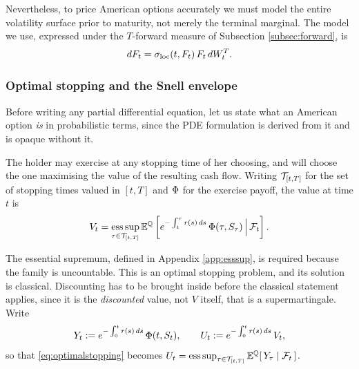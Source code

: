 Nevertheless, to price American options accurately we must model the entire volatility surface prior 
to maturity, not merely the terminal marginal. The model we use, expressed under the $T$-forward 
measure of Subsection \ref{subsec:forward}, is
\begin{equation}\label{eq:localvolforward}
    dF_t = \sigma_{\mathrm{loc}}(t,F_t)\,F_t \, dW^{T}_t .
\end{equation}


\subsubsection*{Optimal stopping and the Snell envelope}

Before writing any partial differential equation, let us state what an American option \emph{is} in 
probabilistic terms, since the PDE formulation is derived from it and is opaque without it.

The holder may exercise at any stopping time of her choosing, and will choose the one maximising the 
value of the resulting cash flow. Writing $\mathcal{T}_{[t,T]}$ for the set of stopping times valued in 
$[t,T]$ and $\Phi$ for the exercise payoff, the value at time $t$ is
\begin{equation}\label{eq:optimalstopping}
V_t = \operatorname*{ess\,sup}_{\tau \in \mathcal{T}_{[t,T]}} 
\mathbb{E}^{\mathbb{Q}}\left[ e^{-\int_t^{\tau}r(s)\,ds}\,\Phi(\tau, S_\tau) \,\Big|\, \mathcal{F}_t \right].
\end{equation}

\newpage

The essential supremum, defined in Appendix \ref{app:esssup}, is required because the family is uncountable. This is an optimal stopping 
problem, and its solution is classical. Discounting has to be brought inside before the classical statement applies, since it is the
\emph{discounted} value, not $V$ itself, that is a supermartingale. Write
\begin{equation}\label{eq:snellnormalisation}
Y_t := e^{-\int_0^{t}r(s)\,ds}\,\Phi(t,S_t), \qquad
U_t := e^{-\int_0^{t}r(s)\,ds}\,V_t ,
\end{equation}
so that \eqref{eq:optimalstopping} becomes
$U_t = \operatorname*{ess\,sup}_{\tau\in\mathcal{T}_{[t,T]}} \mathbb{E}^{\mathbb{Q}}[\,Y_\tau \mid \mathcal{F}_t\,]$.

